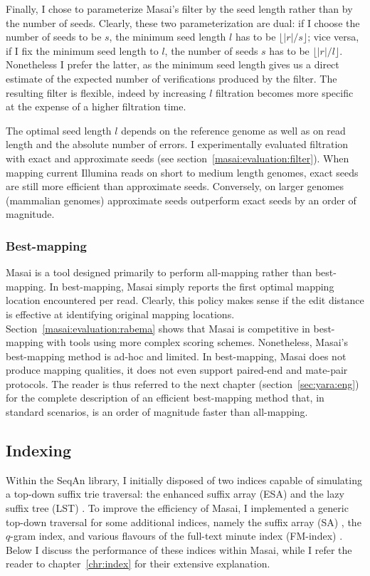Finally, I chose to parameterize Masai's filter by the seed length rather than by the number of seeds.
Clearly, these two parameterization are dual: if I choose the number of seeds to be $s$, the minimum seed length $l$ has to be $\lfloor |r|/s \rfloor$; vice versa, if I fix the minimum seed length to $l$, the number of seeds $s$ has to be $\lfloor |r|/l \rfloor$.
Nonetheless I prefer the latter, as the minimum seed length gives us a direct estimate of the expected number of verifications produced by the filter.
The resulting filter is flexible, indeed by increasing $l$ filtration becomes more specific at the expense of a higher filtration time.

The optimal seed length $l$ depends on the reference genome as well as on read length and the absolute number of errors.
I experimentally evaluated filtration with exact and approximate seeds (see section~\ref{masai:evaluation:filter}).
When mapping current Illumina reads on short to medium length genomes, exact seeds are still more efficient than approximate seeds.
Conversely, on larger genomes (\eg mammalian genomes) approximate seeds outperform exact seeds by an order of magnitude.

\subsubsection{Best-mapping}

Masai is a tool designed primarily to perform all-mapping rather than best-mapping.
In best-mapping, Masai simply reports the first optimal mapping location encountered per read.
Clearly, this policy makes sense if the edit distance is effective at identifying original mapping locations.
Section~\ref{masai:evaluation:rabema} shows that Masai is competitive in best-mapping with tools using more complex scoring schemes.
Nonetheless, Masai's best-mapping method is ad-hoc and limited.
In best-mapping, Masai does not produce mapping qualities, it does not even support paired-end and mate-pair protocols.
The reader is thus referred to the next chapter (section~\ref{sec:yara:eng}) for the complete description of an efficient best-mapping method that, in standard scenarios, is an order of magnitude faster than all-mapping.

\subsection{Indexing}
\label{masai:engineering:index}

Within the SeqAn library, I initially disposed of two indices capable of simulating a top-down suffix trie traversal: the enhanced suffix array (ESA) \citep{Abouelhoda2004} and the lazy suffix tree (LST) \citep{Giegerich1999}.
To improve the efficiency of Masai, I implemented a generic top-down traversal for some additional indices, namely the suffix array (SA) \citep{Manber1990}, the $q$-gram index, and various flavours of the full-text minute index (FM-index) \citep{Ferragina2001}.
Below I discuss the performance of these indices within Masai, while I refer the reader to chapter~\ref{chr:index} for their extensive explanation.


